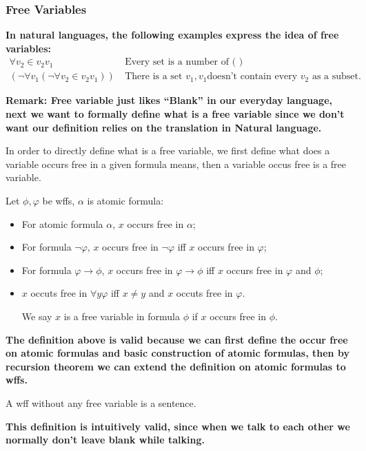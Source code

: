 \documentclass[11pt]{article}
\begin{document}
\subsubsection{Free Variables}
\label{sec:orgf9ad0f6}
\textbf{In natural languages, the following examples express the idea of free variables:}
\begin{align*}
\forall v_2 \in v_2v_1 & \  \text{Every set is a number of (  )} \\
(\neg\forall v_1(\neg \forall v_2 \in v_2v_1)) & \ \text{There is a set } v_1, v_1 \text{doesn't contain every } v_2 \text{ as a subset.}
\end{align*}

\textbf{Remark: Free variable just likes ``Blank'' in our everyday language, next we want to formally define what is a free variable since we don't want our definition relies on the translation in Natural language.}

In order to directly define what is a free variable, we first define what does a variable occurs free in a given formula means, then a variable occus free is a free variable.

\begin{definition}
Let \(\phi,\varphi\) be wffs, \(\alpha\) is atomic formula:
\begin{itemize}
\item For atomic formula \(\alpha\), \(x\) occurs free in \(\alpha\);
\item For formula \(\neg\varphi\), \(x\) occurs free in \(\neg\varphi\) iff \(x\) occurs free in \(\varphi\);
\item For formula \(\varphi \to \phi\), \(x\) occurs free in \(\varphi \to \phi\) iff \(x\) occurs free in \(\varphi\) and \(\phi\);
\item \(x\) occuts free in \(\forall y \varphi\) iff \(x \neq y\) and \(x\) occuts free in \(\varphi\).

We say \(x\) is a free variable in formula \(\phi\) if \(x\) occurs free in \(\phi\).
\end{itemize}
\end{definition}

\textbf{The definition above is valid because we can first define the occur free on atomic formulas and basic construction of atomic formulas, then by recursion theorem we can extend the definition on atomic formulas to wffs.}


\begin{definition}[Sentence]
A wff without any free variable is a sentence.
\end{definition}
\textbf{This definition is intuitively valid, since when we talk to each other we normally don't leave blank while talking.}
\end{document}
